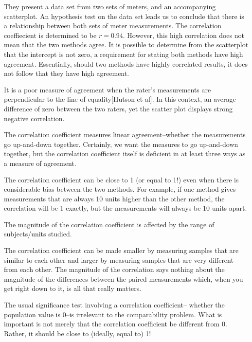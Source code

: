 \documentclass[12pt, a4paper]{report}
\theoremstyle{plain}
\theoremstyle{definition}
\theoremstyle{remark}
\begin{document}
	They present a data set from two sets of meters, and an
	accompanying scatterplot. An hypothesis test on the data set leads
	us to conclude that there is a relationship between both sets of
	meter measurements. The correlation coeffiecient is determined to
	be $r =0.94 $. However, this high correlation does not mean that the
	two methods agree. It is possible to determine from the
	scatterplot that the intercept is not zero, a requirement for
	stating both methods have high agreement. Essentially, should two
	methods have highly correlated results, it does not follow that
	they have high agreement.
	
It is a poor measure of agreement when the rater's measurements
are perpendicular to the line of equality[Hutson et al]. In this
context, an average difference of zero between the two raters, yet
the scatter plot displays strong negative correlation.
	

The correlation coefficient measures linear agreement--whether the measurements go up-and-down together. Certainly, we want the measures to go up-and-down together, but the correlation coefficient itself is deficient in at least three ways as a measure of agreement.

The correlation coefficient can be close to 1 (or equal to 1!) even when there is considerable bias between the two methods. For example, if one method gives measurements that are always 10 units higher than the other method, the correlation will be 1 exactly, but the measurements will always be 10 units apart.

The magnitude of the correlation coefficient is affected by the range of subjects/units studied. 

The correlation coefficient can be made smaller by measuring samples that are similar to each other and larger by measuring samples that are very different from each other. The magnitude of the correlation says nothing about the magnitude of the differences between the paired measurements which, when you get right down to it, is all that really matters.

The usual significance test involving a correlation coefficient-- whether the population value is 0--is irrelevant to the comparability problem. What is important is not merely that the correlation coefficient be different from 0. Rather, it should be close to (ideally, equal to) 1!
	





\end{document}
